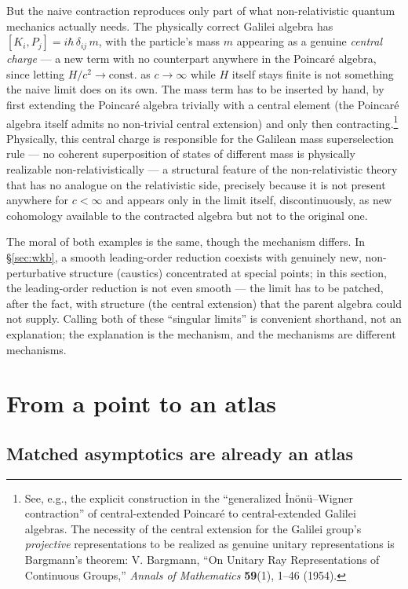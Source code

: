 \documentclass[11pt]{book}
\begin{document}
But the naive contraction reproduces only part of what non-relativistic quantum mechanics actually needs. The physically correct Galilei algebra has $[K_i,P_j] = i\hbar\,\delta_{ij}\,m$, with the particle's mass $m$ appearing as a genuine \emph{central charge} --- a new term with no counterpart anywhere in the Poincar\'e algebra, since letting $H/c^2 \to \text{const.}$ as $c\to\infty$ while $H$ itself stays finite is not something the naive limit does on its own. The mass term has to be inserted by hand, by first extending the Poincar\'e algebra trivially with a central element (the Poincar\'e algebra itself admits no non-trivial central extension) and only then contracting.\footnote{See, e.g., the explicit construction in the ``generalized \.{I}n\"on\"u--Wigner contraction'' of central-extended Poincar\'e to central-extended Galilei algebras. The necessity of the central extension for the Galilei group's \emph{projective} representations to be realized as genuine unitary representations is Bargmann's theorem: V. Bargmann, ``On Unitary Ray Representations of Continuous Groups,'' \emph{Annals of Mathematics} \textbf{59}(1), 1--46 (1954).} Physically, this central charge is responsible for the Galilean mass superselection rule --- no coherent superposition of states of different mass is physically realizable non-relativistically --- a structural feature of the non-relativistic theory that has no analogue on the relativistic side, precisely because it is not present anywhere for $c<\infty$ and appears only in the limit itself, discontinuously, as new cohomology available to the contracted algebra but not to the original one.

The moral of both examples is the same, though the mechanism differs. In \S\ref{sec:wkb}, a smooth leading-order reduction coexists with genuinely new, non-perturbative structure (caustics) concentrated at special points; in this section, the leading-order reduction is not even smooth --- the limit has to be patched, after the fact, with structure (the central extension) that the parent algebra could not supply. Calling both of these ``singular limits'' is convenient shorthand, not an explanation; the explanation is the mechanism, and the mechanisms are different mechanisms.

\section{From a point to an atlas}

\subsection{Matched asymptotics are already an atlas}
\end{document}
